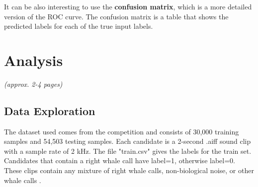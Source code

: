 \documentclass[]{article}
\begin{document}
It can be also interesting to use the \textbf{confusion matrix}, which is a more detailed version of the ROC curve. The confusion matrix is a table that shows the predicted labels for each of the true input labels.

\section{Analysis}\label{ii.-analysis}

\emph{(approx. 2-4 pages)}
\subsection{Data Exploration}\label{data-exploration}

The dataset used comes from the competition and consists of 30,000 training samples and 54,503 testing samples. Each candidate is a 2-second .aiff sound clip with a sample rate of 2 kHz. The file "train.csv" gives the labels for the train set. Candidates that contain a right whale call have label=1, otherwise label=0. These clips contain any mixture of right whale calls, non-biological noise, or other whale calls \cite{CornellWeb, CornellWeb2}. 
\end{document}
